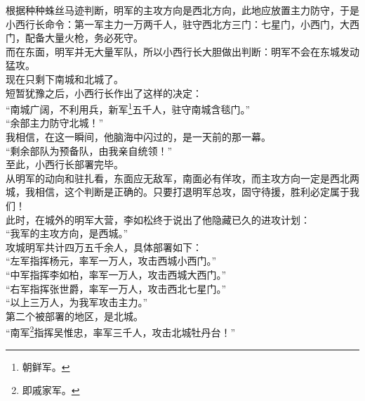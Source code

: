 \begin{multicols}{\theparacolNo}
根据种种蛛丝马迹判断，明军的主攻方向是西北方向，此地应放置主力防守，于是小西行长命令：第一军主力一万两千人，驻守西北方三门：七星门，小西门，大西门，配备大量火枪，务必死守。\\

而在东面，明军并无大量军队，所以小西行长大胆做出判断：明军不会在东城发动猛攻。\\

现在只剩下南城和北城了。\\

短暂犹豫之后，小西行长作出了这样的决定：\\

“南城广阔，不利用兵，新军\footnote{朝鲜军。}五千人，驻守南城含毯门。”\\

“余部主力防守北城！”\\

我相信，在这一瞬间，他脑海中闪过的，是一天前的那一幕。\\

“剩余部队为预备队，由我亲自统领！”\\

至此，小西行长部署完毕。\\

从明军的动向和驻扎看，东面应无敌军，南面必有佯攻，而主攻方向一定是西北两城，我相信，这个判断是正确的。只要打退明军总攻，固守待援，胜利必定属于我们！\\

此时，在城外的明军大营，李如松终于说出了他隐藏已久的进攻计划：\\

“我军的主攻方向，是西城。”\\

攻城明军共计四万五千余人，具体部署如下：\\

“左军指挥杨元，率军一万人，攻击西城小西门。”\\

“中军指挥李如柏，率军一万人，攻击西城大西门。”\\

“右军指挥张世爵，率军一万人，攻击西北七星门。”\\

“以上三万人，为我军攻击主力。”\\

第二个被部署的地区，是北城。\\

“南军\footnote{即戚家军。}指挥吴惟忠，率军三千人，攻击北城牡丹台！”\\


\end{multicols}
